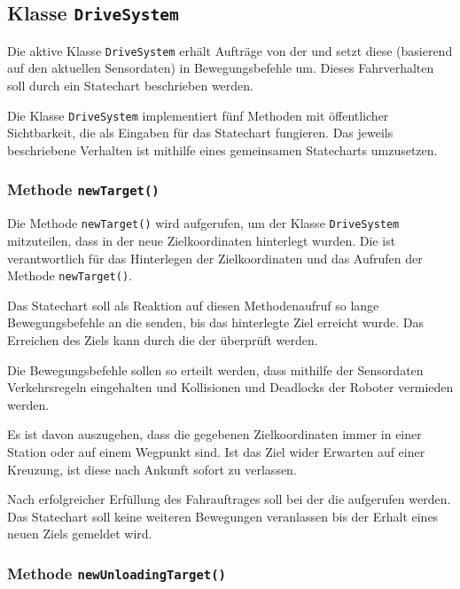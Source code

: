 \subsection{Klasse \texttt{DriveSystem}}
\label{class:drive}

Die aktive Klasse \texttt{DriveSystem} erhält Aufträge von der  und setzt diese (basierend auf den aktuellen Sensordaten) in Bewegungsbefehle um. 
Dieses Fahrverhalten soll durch ein Statechart beschrieben werden.

Die Klasse \texttt{DriveSystem} implementiert fünf Methoden mit öffentlicher Sichtbarkeit, die als Eingaben für das Statechart fungieren. 
Das jeweils beschriebene Verhalten ist mithilfe eines gemeinsamen Statecharts umzusetzen.


\subsubsection{Methode \texttt{newTarget()}}
\label{method:newtarget}

Die Methode \texttt{newTarget()} wird aufgerufen, um der Klasse \texttt{DriveSystem} mitzuteilen, dass in der  neue Zielkoordinaten hinterlegt wurden.
Die  ist verantwortlich für das Hinterlegen der Zielkoordinaten und das Aufrufen der Methode \texttt{newTarget()}.

Das Statechart soll als Reaktion auf diesen Methodenaufruf so lange Bewegungsbefehle an die  senden, bis das hinterlegte Ziel erreicht wurde. 
Das Erreichen des Ziels kann durch die  der  überprüft werden.

Die Bewegungsbefehle sollen so erteilt werden, dass mithilfe der Sensordaten Verkehrsregeln eingehalten und Kollisionen und Deadlocks der Roboter vermieden werden. 

Es ist davon auszugehen, dass die gegebenen Zielkoordinaten immer in einer Station oder auf einem Wegpunkt sind. 
Ist das Ziel wider Erwarten auf einer Kreuzung, ist diese nach Ankunft sofort zu verlassen.

Nach erfolgreicher Erfüllung des Fahrauftrages soll bei der  die  aufgerufen werden. Das Statechart soll keine weiteren Bewegungen veranlassen bis der Erhalt eines neuen Ziels gemeldet wird.



\subsubsection{Methode \texttt{newUnloadingTarget()}}
\label{method:unloadingtarget}

